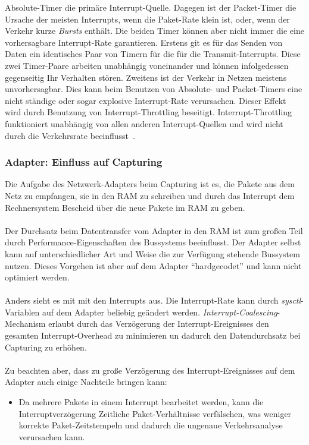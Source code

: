 {Absolute-Timer die primäre Interrupt-Quelle. Dagegen ist der Packet-Timer die
Ursache der meisten Interrupts, wenn die Paket-Rate klein ist, oder, wenn der
Verkehr  kurze \emph{Bursts} enthält. Die beiden Timer können aber nicht immer
die eine vorhersagbare Interrupt-Rate garantieren.  Erstens git es
für das Senden von Daten ein identisches Paar von Timern für die
für die Transmit-Interrupts. Diese zwei
Timer-Paare arbeiten unabhängig voneinander und können
infolgedessen gegenseitig Ihr Verhalten stören. Zweitens ist der Verkehr in
Netzen meistens unvorhersagbar. Dies kann beim Benutzen von Absolute- und
Packet-Timers eine nicht ständige oder sogar explosive Interrupt-Rate
verursachen.
Dieser Effekt wird durch Benutzung von Interrupt-Throttling beseitigt.
Interrupt-Throttling funktioniert unabhängig von allen anderen
Interrupt-Quellen und wird nicht durch die Verkehrsrate
beeinflusst~\cite{intrr_mod}.
%
\subsubsection*{Adapter: Einfluss auf Capturing}\label{sec:adapt_perf_analyse}
Die Aufgabe des Netzwerk-Adapters beim Capturing ist es, die Pakete aus dem
Netz zu empfangen, sie in den RAM zu schreiben und durch das Interrupt dem
Rechnersystem Bescheid über die neue Pakete im RAM zu geben.\\\\
Der Durchsatz beim Datentransfer vom Adapter in den RAM ist zum großen Teil 
durch Performance-Eigenschaften des Bussystems beeinflusst. Der Adapter selbst 
kann auf unterschiedlicher Art und Weise die zur Verfügung stehende 
Bussystem nutzen. Dieses Vorgehen ist aber auf dem Adapter ``hardgecodet'' und kann 
nicht optimiert werden.\\\\
Anders sieht es mit mit den Interrupts aus. Die Interrupt-Rate kann durch
\emph{sysctl}-Variablen auf dem Adapter beliebig geändert werden.
\emph{Interrupt-Coalescing}-Mechanism erlaubt durch das Verzögerung der
Interrupt-Ereignisses den gesamten Interrupt-Overhead zu minimieren un dadurch
den Datendurchsatz bei Capturing zu erhöhen.\\\\
%
Zu beachten aber, dass zu große Verzögerung des Interrupt-Ereignisses auf dem Adapter
auch einige Nachteile bringen kann:
\begin{itemize}
	\item Da mehrere Pakete in einem Interrupt bearbeitet werden,
		kann die Interruptverzögerung Zeitliche Paket-Verhältnisse
		verfälschen, was weniger korrekte Paket-Zeitstempeln und 
		dadurch die ungenaue Verkehrsanalyse verursachen kann.


\end{itemize}}
